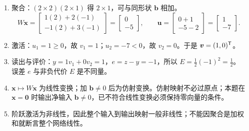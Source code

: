 \begin{enumerate}
\item 聚合：\((2\times2)(2\times1)\) 得 \(2\times1\)，可与同形状 \(\bm b\) 相加。
\[
W\bm x=\begin{bmatrix}1(2)+2(-1)\\-1(2)+3(-1)\end{bmatrix}
=\begin{bmatrix}0\\-5\end{bmatrix},\qquad
\bm u=\begin{bmatrix}0+1\\-5-2\end{bmatrix}=\begin{bmatrix}1\\-7\end{bmatrix}.
\]
\item 激活：\(u_1=1\ge0\)，故 \(v_1=1\)；\(u_2=-7<0\)，故 \(v_2=0\)。于是 \(\bm v=(1,0)^{\mathsf T}\)。
\item 读出与评价：\(y=1v_1+0v_2=1\)，\(e=z-y=-1\)，所以 \(E=\tfrac12(-1)^2=\tfrac12\)。误差 \(e\) 与非负代价 \(E\) 是不同量。
\item \(\bm x\mapsto W\bm x\) 为线性变换；加 \(\bm b\ne0\) 后为仿射变换。仿射映射不必过原点；本题在 \(\bm x=\bm0\) 时输出净输入 \(\bm b\ne0\)，已不符合线性变换必须保持零向量的条件。
\item 阶跃激活为非线性，因此整个输入到输出映射一般非线性；不能因聚合是加权和就断言整个网络线性。
\end{enumerate}


